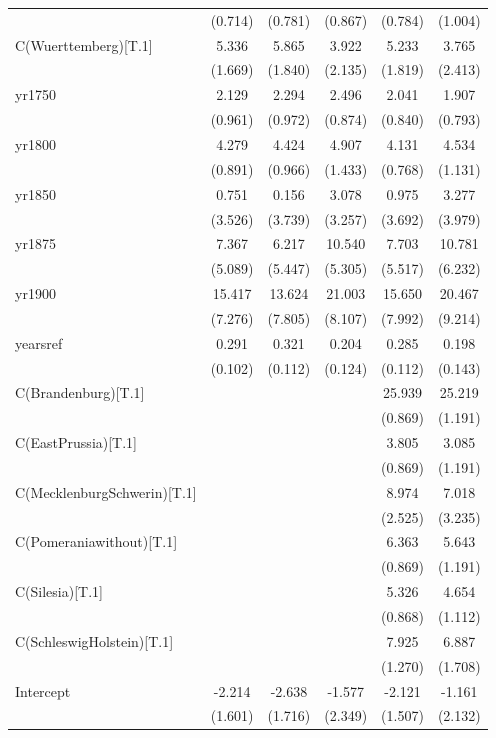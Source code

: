 {\begin{tabular}{@{\extracolsep{2pt}}l*{5}{c}@{}}
 & (0.714) & (0.781) & (0.867) & (0.784) & (1.004) \\
C(Wuerttemberg)[T.1] & 5.336\sym{***} & 5.865\sym{***} & 3.922\sym{*} & 5.233\sym{***} & 3.765 \\
 & (1.669) & (1.840) & (2.135) & (1.819) & (2.413) \\
yr1750 & 2.129\sym{**} & 2.294\sym{**} & 2.496\sym{***} & 2.041\sym{**} & 1.907\sym{**} \\
 & (0.961) & (0.972) & (0.874) & (0.840) & (0.793) \\
yr1800 & 4.279\sym{***} & 4.424\sym{***} & 4.907\sym{***} & 4.131\sym{***} & 4.534\sym{***} \\
 & (0.891) & (0.966) & (1.433) & (0.768) & (1.131) \\
yr1850 & 0.751 & 0.156 & 3.078 & 0.975 & 3.277 \\
 & (3.526) & (3.739) & (3.257) & (3.692) & (3.979) \\
yr1875 & 7.367 & 6.217 & 10.540\sym{**} & 7.703 & 10.781\sym{*} \\
 & (5.089) & (5.447) & (5.305) & (5.517) & (6.232) \\
yr1900 & 15.417\sym{**} & 13.624\sym{*} & 21.003\sym{***} & 15.650\sym{*} & 20.467\sym{**} \\
 & (7.276) & (7.805) & (8.107) & (7.992) & (9.214) \\
yearsref & 0.291\sym{***} & 0.321\sym{***} & 0.204\sym{*} & 0.285\sym{**} & 0.198 \\
 & (0.102) & (0.112) & (0.124) & (0.112) & (0.143) \\
C(Brandenburg)[T.1] &  &  &  & 25.939 & 25.219 \\
 &  &  &  & (0.869) & (1.191) \\
C(EastPrussia)[T.1] &  &  &  & 3.805\sym{***} & 3.085\sym{***} \\
 &  &  &  & (0.869) & (1.191) \\
C(MecklenburgSchwerin)[T.1] &  &  &  & 8.974\sym{***} & 7.018\sym{**} \\
 &  &  &  & (2.525) & (3.235) \\
C(Pomeraniawithout)[T.1] &  &  &  & 6.363\sym{***} & 5.643\sym{***} \\
 &  &  &  & (0.869) & (1.191) \\
C(Silesia)[T.1] &  &  &  & 5.326\sym{***} & 4.654\sym{***} \\
 &  &  &  & (0.868) & (1.112) \\
C(SchleswigHolstein)[T.1] &  &  &  & 7.925\sym{***} & 6.887\sym{***} \\
 &  &  &  & (1.270) & (1.708) \\
Intercept & -2.214 & -2.638 & -1.577 & -2.121 & -1.161 \\
 & (1.601) & (1.716) & (2.349) & (1.507) & (2.132) \\


\end{tabular}}
